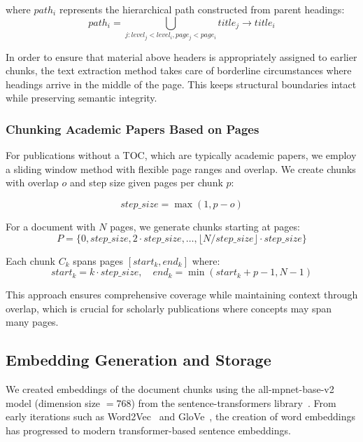 \documentclass[runningheads]{llncs}
\begin{document}
where $path_i$ represents the hierarchical path constructed from parent headings:
\begin{equation}
path_i = \bigcup_{j: level_j < level_i, page_j < page_i} title_j \rightarrow title_i
\end{equation}

In order to ensure that material above headers is appropriately assigned to earlier chunks, the text extraction method takes care of borderline circumstances where headings arrive in the middle of the page. This keeps structural boundaries intact while preserving semantic integrity.

\subsubsection{Chunking Academic Papers Based on Pages}
For publications without a TOC, which are typically academic papers, we employ a sliding window method with flexible page ranges and overlap. We create chunks with overlap $o$ and step size given pages per chunk $p$:

\begin{equation}
step\_size = \max(1, p - o)
\end{equation}

For a document with $N$ pages, we generate chunks starting at pages:
\begin{equation}
P = \{0, step\_size, 2 \cdot step\_size, \ldots, \lfloor N/step\_size \rfloor \cdot step\_size\}
\end{equation}

Each chunk $C_k$ spans pages $[start_k, end_k]$ where:
\begin{equation}
start_k = k \cdot step\_size, \quad end_k = \min(start_k + p - 1, N - 1)
\end{equation}

This approach ensures comprehensive coverage while maintaining context through overlap, which is crucial for scholarly publications where concepts may span many pages.

\subsection{Embedding Generation and Storage}

We created embeddings of the document chunks using the all-mpnet-base-v2 model (dimension size $=768$) from the sentence-transformers library~\cite{reimers2019sentence}. From early iterations such as Word2Vec~\cite{mikolov2013word2vec} and GloVe~\cite{pennington2014glove}, the creation of word embeddings has progressed to modern transformer-based sentence embeddings.
\end{document}
